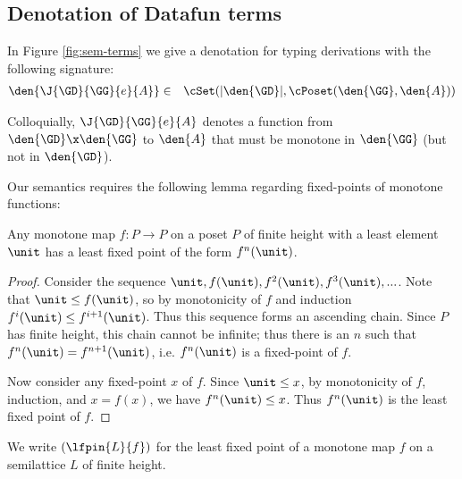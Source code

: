 
\subsection{Denotation of Datafun terms}

In Figure \ref{fig:sem-terms} we give a denotation for typing derivations with
the following signature:
\begin{eqnarray*}
  \den{\J{\GD}{\GG}{e}{A}} &\in&
  \cSet(\U{\den{\GD}}, \cPoset(\den{\GG}, \den{A}))
\end{eqnarray*}

Colloquially, $\J{\GD}{\GG}{e}{A}$ denotes a function from $\den{\GD} \x
\den{\GG}$ to $\den{A}$ that must be monotone in $\den{\GG}$ (but not in
$\den{\GD}$).

Our semantics requires the following lemma regarding fixed-points of monotone
functions:

\begin{lemma}
  Any monotone map $f : P \to P$ on a poset $P$ of finite height with a least
  element $\unit$ has a least fixed point of the form $f^n(\unit)$.
\end{lemma}

\begin{proof}
  Consider the sequence $\unit, f(\unit), f^2(\unit), f^3(\unit), ...$. Note that
  $\unit \le f(\unit)$, so by monotonicity of $f$ and induction $f^i(\unit) \le
  f^{i+1}(\unit)$. Thus this sequence forms an ascending chain. Since $P$ has
  finite height, this chain cannot be infinite; thus there is an $n$ such that
  $f^n(\unit) = f^{n+1}(\unit)$, i.e. $f^n(\unit)$ is a fixed-point of $f$.

  Now consider any fixed-point $x$ of $f$. Since $\unit \le x$, by monotonicity of
  $f$, induction, and $x = f(x)$, we have $f^n(\unit) \le x$. Thus $f^n(\unit)$ is
  the least fixed point of $f$.
\end{proof}

We write $(\lfpin{L}{f})$ for the least fixed point of a monotone map $f$ on a
semilattice $L$ of finite height.


